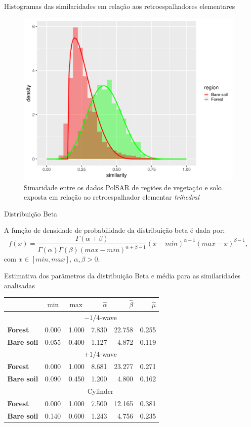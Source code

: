 \documentclass{beamer} %
\begin{document}
\begin{frame}{Histogramas das similaridades em relação aos retroespalhadores elementares}

\begin{figure}
    \centering
    \includegraphics[width = .6\linewidth]{tr.pdf}
    \caption{Simaridade entre os dados PolSAR de regiões de vegetação e solo exposta em relação ao retroespalhador elementar \textit{trihedral}}
    \label{fig:tr}
\end{figure}
    
\end{frame}

\begin{frame}{Distribuição Beta}

A função de densidade de probabilidade da distribuição beta é dada por:
$$
f(x) = \frac{\Gamma(\alpha+\beta)}{\Gamma(\alpha)\Gamma(\beta)(max - min)^{\alpha + \beta - 1}}(x - min)^{\alpha-1}(max-x)^{\beta-1},
$$
com $x \in [min, max]$, $\alpha,\beta>0$.
    
\end{frame}

\begin{frame}{Estimativa dos parâmetros da distribuição Beta e média para as similaridades analisadas}
\begin{table}[hbt]
\centering
\begin{tabular}{lrrrrr}
\toprule
& $\min$ & $\max$ & $\widehat\alpha$ & $\widehat\beta$ & $\widehat\mu$\\ \midrule
& \multicolumn{5}{c}{$-1/4$-wave}\\
\cmidrule(lr){2-6}
\textbf{Forest} & 0.000 & 1.000 & 7.830 & 22.758 & 0.255\\
\textbf{Bare soil} & 0.055 & 0.400 & 1.127 & 4.872 & 0.119\\
\midrule
%
& \multicolumn{5}{c}{$+1/4$-wave}\\
\cmidrule(lr){2-6}
\textbf{Forest} & 0.000 & 1.000 & 8.681 & 23.277 & 0.271\\
\textbf{Bare soil} & 0.090 & 0.450 & 1.200 & 4.800 & 0.162\\
\midrule
%
& \multicolumn{5}{c}{Cylinder}\\
\cmidrule(lr){2-6}
\textbf{Forest} & 0.000 & 1.000 & 7.500 & 12.165 & 0.381\\
\textbf{Bare soil} & 0.140 & 0.600 & 1.243 & 4.756 & 0.235\\
\bottomrule
\end{tabular}
\end{table}
\end{frame}
\end{document}
